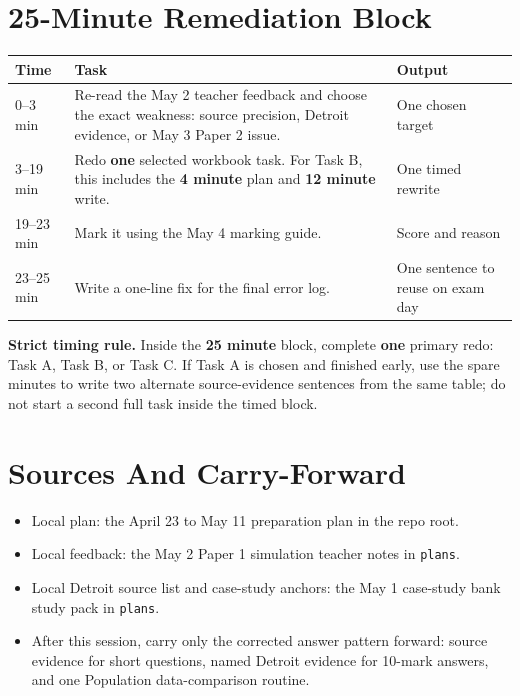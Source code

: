 \documentclass[11pt,a4paper]{article}
\newcommand{\term}[1]{\textcolor{HeadingBlue}{\textbf{#1}}}
\newcommand{\boxnote}[3]{%
\noindent\colorbox{#1}{%
  \begin{minipage}{0.965\textwidth}
  \sffamily
  \textbf{\textcolor{HeadingBlue}{#2}} #3
  \end{minipage}
}}
\begin{document}
\section{25-Minute Remediation Block}

\begin{tabularx}{\textwidth}{L{0.16\textwidth}Y L{0.22\textwidth}}
\toprule
\textbf{Time} & \textbf{Task} & \textbf{Output} \\
--3 min & Re-read the May 2 teacher feedback and choose the exact weakness:
source precision, Detroit evidence, or May 3 Paper 2 issue. & One chosen
target \\
3--19 min & Redo \term{one} selected workbook task. For Task B, this includes
the \term{4 minute} plan and \term{12 minute} write. & One timed rewrite \\
19--23 min & Mark it using the May 4 marking guide. & Score and reason \\
23--25 min & Write a one-line fix for the final error log. & One sentence to
reuse on exam day \\
\bottomrule
\end{tabularx}

\boxnote{SoftTint}{Strict timing rule.}{Inside the \term{25 minute} block,
complete \term{one} primary redo: Task A, Task B, or Task C. If Task A is
chosen and finished early, use the spare minutes to write two alternate
source-evidence sentences from the same table; do not start a second full task
inside the timed block.}

\section{Sources And Carry-Forward}

\begin{itemize}
  \item Local plan: the April 23 to May 11 preparation plan in the repo root.
  \item Local feedback: the May 2 Paper 1 simulation teacher notes in
  \texttt{plans}.
  \item Local Detroit source list and case-study anchors: the May 1 case-study
  bank study pack in \texttt{plans}.
  \item After this session, carry only the corrected answer pattern forward:
  source evidence for short questions, named Detroit evidence for 10-mark
  answers, and one Population data-comparison routine.
\end{itemize}
\end{document}
